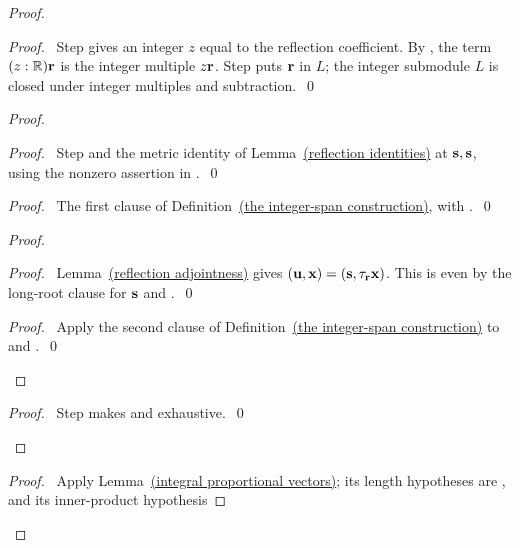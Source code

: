 \begin{mergedproofsection}
\begin{proof}
\begin{proof}\pf\ Step  gives an integer $z$
equal to the reflection coefficient. By ,
the term $(z:{\mathbb R}){\mathbf r}$ is the integer multiple $z{\mathbf r}$.
Step  puts ${\mathbf r}$ in $L$; the integer submodule
$L$ is closed under integer multiples and subtraction.~\qed\end{proof}
\begin{proof}
 \begin{proof}\pf\ Step  and
 the metric identity of Lemma~\hyperref[lem:rem-reflection]{(reflection identities)} at
 ${\mathbf s},{\mathbf s}$, using the nonzero assertion in .~\qed\end{proof}
 \begin{proof}\pf\ The first clause of Definition~\hyperref[def:312-integral-roots]{(the integer-span construction)},
 with .~\qed\end{proof}
 \begin{proof}
  \begin{proof}\pf\ Lemma~\hyperref[lem:312-reflection]{(reflection adjointness)} gives
  $({\mathbf u},{\mathbf x})=({\mathbf s},\tau_{{\mathbf r}}{\mathbf x})$. This is even by the long-root
  clause for ${\mathbf s}$ and .~\qed\end{proof}
  \qedstep
  \begin{proof}\pf\ Apply the second clause of
  Definition~\hyperref[def:312-integral-roots]{(the integer-span construction)} to 
  and .~\qed\end{proof}
 \end{proof}
 \qedstep
 \begin{proof}\pf\ Step  makes
  and  exhaustive.~\qed\end{proof}
\end{proof}
\begin{proof}\pf\ Apply Lemma~\hyperref[lem:312-proportional]{(integral proportional vectors)}; its length
hypotheses are , and its inner-product hypothesis

\end{proof}
\end{proof}
\end{mergedproofsection}
